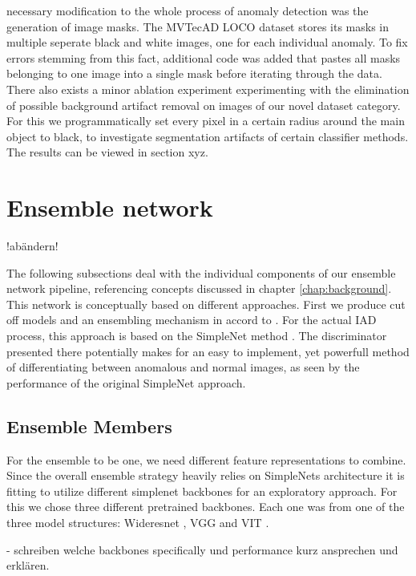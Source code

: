 necessary modification to the whole process of anomaly detection was the generation of image masks. The MVTecAD LOCO dataset stores its 
masks in multiple seperate black and white images, one for each individual anomaly. To fix errors stemming from this fact, additional 
code was added that pastes all masks belonging to one image into a single mask before iterating through the data. 
There also exists a minor ablation experiment experimenting with the elimination 
of possible background artifact removal on images of our novel dataset category. For this we programmatically set every pixel in a certain radius around the main object to black, to investigate 
segmentation artifacts of certain classifier methods. The results can be viewed in section xyz.




\section{Ensemble network}
\label{sec:ourensemblenetwork}
!abändern!

The following subsections deal with the individual components of our ensemble network pipeline, referencing concepts discussed in chapter \ref{chap:background}. This network is conceptually based on 
different approaches. First we produce cut off models and an ensembling mechanism in accord to \cite{EnsembleHeller2023}. For the actual IAD process, this approach is based on the SimpleNet method \cite{liu2023simplenet}. 
The discriminator presented there potentially makes for an easy to implement, yet powerfull method of differentiating between anomalous and normal images, as seen by the performance of the original 
SimpleNet approach. 


\subsection{Ensemble Members}
\label{sec:ensemblecandidates}

For the ensemble to be one, we need different feature representations to combine. Since the overall ensemble strategy heavily relies on SimpleNets \cite{liu2023simplenet} architecture 
it is fitting to utilize different simplenet backbones for an exploratory approach. For this we chose three different pretrained backbones. Each one was from one of the three 
model structures: Wideresnet \cite{wideresnet}, VGG \cite{VGG} and VIT \cite{VIT}. 

- schreiben welche backbones specifically und performance kurz ansprechen und erklären.

